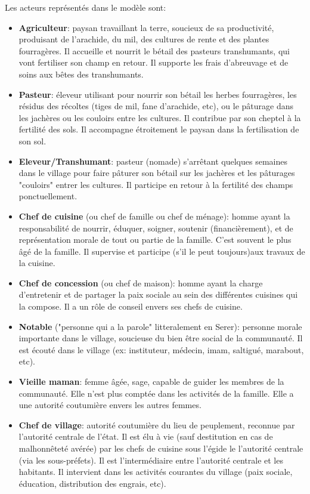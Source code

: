 Les acteurs représentés dans le modèle sont:
\begin{itemize}
  \item \textbf{Agriculteur}: paysan travaillant la terre, soucieux de sa productivité, produisant de l'arachide, du mil, des cultures de rente et des plantes fourragères. Il accueille et nourrit le bétail des pasteurs transhumants, qui vont fertiliser son champ en retour. Il supporte les frais d'abreuvage et de soins aux bêtes des transhumants.
  \item \textbf{Pasteur}: éleveur utilisant pour nourrir son bétail les herbes fourragères, les résidus des récoltes (tiges de mil, fane d'arachide, etc), ou le pâturage dans les jachères ou les couloirs entre les cultures. Il contribue par son cheptel à la fertilité des sols. Il accompagne étroitement le paysan dans la fertilisation de son sol.
  \item \textbf{Eleveur/Transhumant}: pasteur (nomade) s'arrêtant quelques semaines dans le village pour faire pâturer son bétail sur les jachères et les pâturages "couloirs" entrer les cultures. Il participe en retour à la fertilité des champs ponctuellement.
  \item \textbf{Chef de cuisine} (ou chef de famille ou chef de ménage): homme ayant la responsabilité de nourrir, éduquer, soigner, soutenir (financièrement), et de représentation morale de tout ou partie de la famille. C'est souvent le plus âgé de la famille. Il supervise et participe (s'il le peut toujours)aux travaux de la cuisine.
  \item \textbf{Chef de concession} (ou chef de maison): homme ayant la charge d'entretenir et de partager la paix sociale au sein des différentes cuisines qui la compose. Il a un rôle de conseil envers ses chefs de cuisine.
  \item \textbf{Notable} ("personne qui a la parole" litteralement en Serer): personne morale importante dans le village, soucieuse du bien être social de la communauté. Il est écouté dans le village (ex: instituteur, médecin, imam, saltigué, marabout, etc).
  \item \textbf{Vieille maman}:  femme âgée, sage, capable de guider les membres de la communauté. Elle n'est plus comptée dans les activités de la famille. Elle a une autorité coutumière envers les autres femmes.
  \item \textbf{Chef de village}: autorité coutumière du lieu de peuplement, reconnue par l'autorité centrale de l'état. Il est élu à vie (sauf destitution en cas de malhonnêteté avérée) par les chefs de cuisine sous l'égide le l'autorité centrale (via les sous-préfets). Il est l'intermédiaire entre l'autorité centrale et les habitants. Il intervient dans les activités courantes du village (paix sociale, éducation, distribution des engrais, etc).

\end{itemize}
